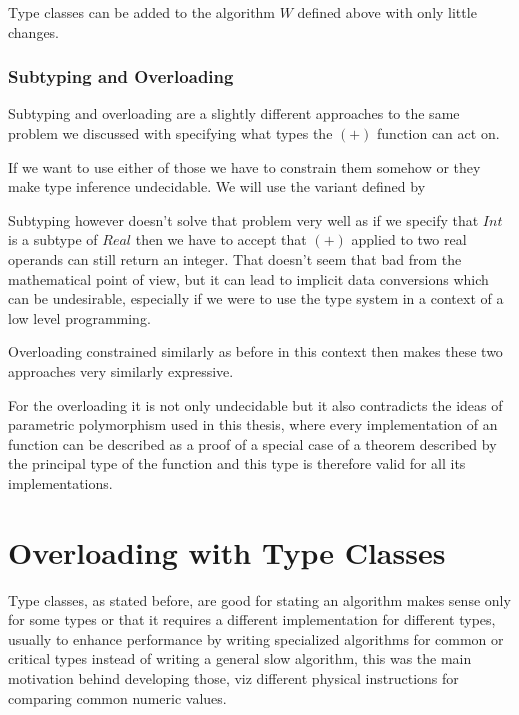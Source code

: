Type classes can be added to the algorithm $W$ defined above with only little changes. %

\subsubsection{Subtyping and Overloading}


Subtyping and overloading are a slightly different approaches to the same problem we discussed with specifying what types the $(+)$ function can act on.

If we want to use either of those we have to constrain them somehow or they make type inference undecidable. We will use the variant defined by %

Subtyping however doesn't solve that problem very well as if we specify that $Int$ is a subtype of $Real$ then we have to accept that $(+)$ applied to two real operands can still return an integer. That doesn't seem that bad from the mathematical point of view, but it can lead to implicit data conversions which can be undesirable, especially if we were to use the type system in a context of a low level programming. %

Overloading constrained similarly as before in this context then makes these two approaches very similarly expressive. %

For the overloading it is not only undecidable but it also contradicts the ideas of parametric polymorphism used in this thesis, where every implementation of an function can be described as a proof of a special case of a theorem described by the principal type of the function and this type is therefore valid for all its implementations. %

\section{Overloading with Type Classes}

Type classes, as stated before, are good for stating an algorithm makes sense only for some types or that it requires a different implementation for different types, usually to enhance performance by writing specialized algorithms for common or critical types instead of writing a general slow algorithm, this was the main motivation behind developing those, %
viz different physical instructions for comparing common numeric values.

